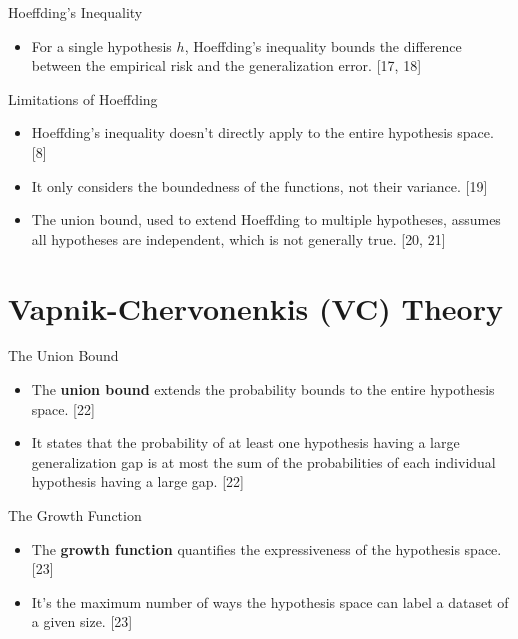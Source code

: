 \documentclass[
  ignorenonframetext,
]{beamer}
\providecommand{\tightlist}{%
  \setlength{\itemsep}{0pt}\setlength{\parskip}{0pt}}\usepackage{longtable,booktabs,array}
\begin{document}
\begin{frame}{Hoeffding's Inequality}
\label{hoeffdings-inequality}
\begin{itemize}
\tightlist
\item
  For a single hypothesis \(h\), Hoeffding's inequality bounds the
  difference between the empirical risk and the generalization error.
  {[}17, 18{]}
\end{itemize}
\end{frame}

\begin{frame}{Limitations of Hoeffding}
\label{limitations-of-hoeffding}
\begin{itemize}
\tightlist
\item
  Hoeffding's inequality doesn't directly apply to the entire hypothesis
  space. {[}8{]}
\item
  It only considers the boundedness of the functions, not their
  variance. {[}19{]}
\item
  The union bound, used to extend Hoeffding to multiple hypotheses,
  assumes all hypotheses are independent, which is not generally true.
  {[}20, 21{]}
\end{itemize}
\end{frame}

\section{Vapnik-Chervonenkis (VC)
Theory}\label{vapnik-chervonenkis-vc-theory}

\begin{frame}{The Union Bound}
\label{the-union-bound}
\begin{itemize}
\tightlist
\item
  The \textbf{union bound} extends the probability bounds to the entire
  hypothesis space. {[}22{]}
\item
  It states that the probability of at least one hypothesis having a
  large generalization gap is at most the sum of the probabilities of
  each individual hypothesis having a large gap. {[}22{]}
\end{itemize}
\end{frame}

\begin{frame}{The Growth Function}
\label{the-growth-function}
\begin{itemize}
\tightlist
\item
  The \textbf{growth function} quantifies the expressiveness of the
  hypothesis space. {[}23{]}
\item
  It's the maximum number of ways the hypothesis space can label a
  dataset of a given size. {[}23{]}
\end{itemize}
\end{frame}
\end{document}
